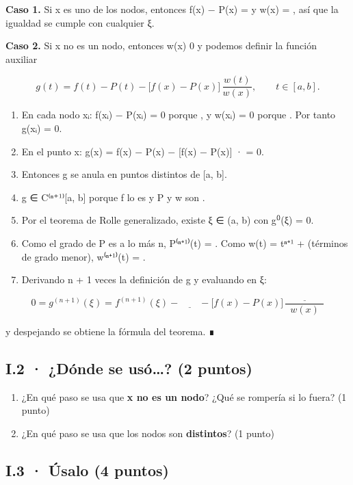 \textbf{Caso 1.} Si x es uno de los nodos, entonces f(x) − P(x) =  y w(x) = , así que la igualdad se cumple con cualquier ξ.

\textbf{Caso 2.} Si x no es un nodo, entonces w(x)  0 y podemos definir la función auxiliar

\[g(t) = f(t) - P(t) - \bigl[f(x) - P(x)\bigr]\,\frac{w(t)}{w(x)}, \qquad t \in [a, b].\]

\begin{enumerate}
\def\labelenumi{\arabic{enumi}.}
\tightlist
\item
  En cada nodo xᵢ: f(xᵢ) − P(xᵢ) = 0 porque , y w(xᵢ) = 0 porque . Por tanto g(xᵢ) = 0.
\item
  En el punto x: g(x) = f(x) − P(x) − {[}f(x) − P(x){]} ·  = 0.
\item
  Entonces g se anula en  puntos distintos de {[}a, b{]}.
\item
  g ∈ C⁽ⁿ⁺¹⁾{[}a, b{]} porque f lo es y P y w son .
\item
  Por el teorema de Rolle generalizado, existe ξ ∈ (a, b) con g⁽⁾(ξ) = 0.
\item
  Como el grado de P es a lo más n, P⁽ⁿ⁺¹⁾(t) = . Como w(t) = tⁿ⁺¹ + (términos de grado menor), w⁽ⁿ⁺¹⁾(t) = .
\item
  Derivando n + 1 veces la definición de g y evaluando en ξ:
\end{enumerate}

\[0 = g^{(n+1)}(\xi) = f^{(n+1)}(\xi) - \underline{\qquad} - \bigl[f(x) - P(x)\bigr]\,\frac{\underline{\qquad\qquad}}{w(x)}\]

y despejando se obtiene la fórmula del teorema. ∎

\subsection{I.2 · ¿Dónde se usó\ldots? (2 puntos)}

\begin{enumerate}
\def\labelenumi{(\alph{enumi})}
\item
  ¿En qué paso se usa que \textbf{x no es un nodo}? ¿Qué se rompería si lo fuera? (1 punto)
\item
  ¿En qué paso se usa que los nodos son \textbf{distintos}? (1 punto)
\end{enumerate}

\subsection{I.3 · Úsalo (4 puntos)}

